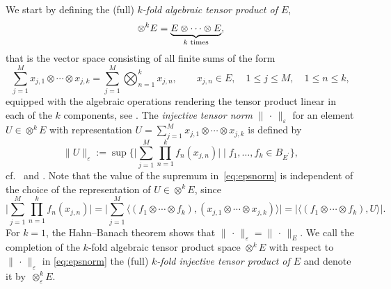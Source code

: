 \documentclass[reqno]{amsart}
\numberwithin{equation}{section}
\newcommand{\xk}{\otimes^k}
\newcommand{\xkeps}{\otimes^k_\varepsilon}
\newcommand{\tenvec}{U}
\newcommand{\norm}[2]{     \| #1       \|_{ #2 }}
\newcommand{\duality}[1]{     \langle #1       \rangle}
\newcommand{\dual}[1]{{#1}^{\prime}}
\newcommand{\eps}{\varepsilon}
\theoremstyle{remark}
\theoremstyle{definition}
\begin{document}
We start by defining the 
(full) \emph{$k$-fold algebraic tensor product of $E$}, 
% 
\[
\xk E = \underbrace{E \otimes \cdots \otimes E}_{
	\text{\normalfont $k$ times}}, 
\] 
%
that is the vector space consisting of all finite sums of the form
% 
\[
\sum_{j=1}^{M} 
x_{j,1} 
\otimes 
\cdots 
\otimes 
x_{j,k} 
= 
\sum_{j=1}^{M} 
\bigotimes_{n=1}^k 
x_{j,n}, 
\qquad 
x_{j,n}\in E,  
\quad 
1\leq j \leq M, 
\quad 
1\leq n \leq k, 
\]
%
equipped with the algebraic operations 
rendering the tensor product  
linear in each of the $k$ components, 
see \cite[Section~1.1]{Floret1997}. 
%
The \emph{injective tensor norm} $\norm{\,\cdot\,}{\eps}$ 
for an element 
$\tenvec\in\xk E$ with representation 
$\tenvec=\sum_{j=1}^{M} 
x_{j,1} 
\otimes 
\cdots 
\otimes 
x_{j,k}$ 
is defined by 
% 
\begin{equation}\label{eq:epsnorm} 
\norm{\tenvec}{\eps} 
:= 
\sup\Biggl\{
\biggl| 
\sum_{j=1}^{M} 
\prod_{n=1}^{k} 
f_n(x_{j,n})  
\biggr| 
\; \Bigg| \;  
f_1,\ldots,f_k\in B_{\dual{E}} 
\Biggr\}, 
\end{equation} 
% 
cf.~\cite[Section~3.1]{Ryan2002} 
and \cite[Section~2.3.2]{JansonKaijser2015}. 
Note that 
the value of
the supremum in~\eqref{eq:epsnorm} 
is independent of the choice of the representation 
of $\tenvec\in\xk E$, since 
%
\[
\biggl| 
\sum_{j=1}^{M} 
\prod_{n=1}^{k} 
f_n(x_{j,n})  
\biggr|  
= 
\biggl| 
\sum_{j=1}^{M} 
\duality{ (f_1 \otimes \cdots \otimes f_k), 
	(x_{j,1} 
	\otimes 
	\cdots 
	\otimes 
	x_{j,k})}  
\biggr| 
= 
|\duality{(f_1 \otimes \cdots \otimes f_k) , \tenvec}|.   
\]
% 
For $k=1$, the Hahn--Banach theorem shows that 
$\norm{\,\cdot\,}{\eps} = \norm{\,\cdot\,}{E}$. 
We call the completion of the $k$-fold 
algebraic tensor product space $\xk E$ 
with respect to $\norm{\,\cdot\,}{\eps}$ in \eqref{eq:epsnorm} 
the (full) \emph{$k$-fold injective tensor product of $E$} 
and denote it by~$\xkeps E$. 
\end{document}
